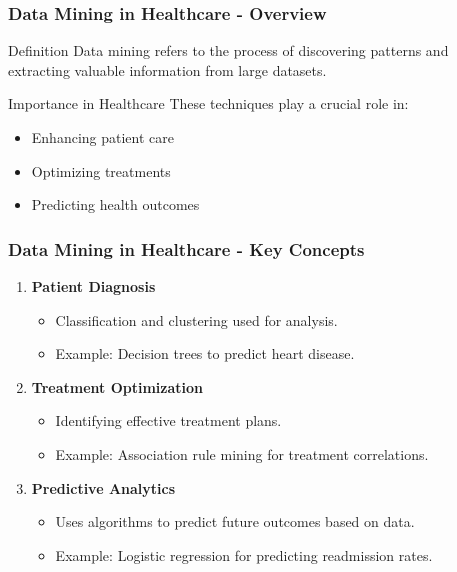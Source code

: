 \documentclass{beamer}
\begin{document}
\begin{frame}[fragile]
    \frametitle{Data Mining in Healthcare - Overview}
    \begin{block}{Definition}
        Data mining refers to the process of discovering patterns and extracting valuable information from large datasets.
    \end{block}
    \begin{block}{Importance in Healthcare}
        These techniques play a crucial role in:
        \begin{itemize}
            \item Enhancing patient care
            \item Optimizing treatments
            \item Predicting health outcomes
        \end{itemize}
    \end{block}
\end{frame}

\begin{frame}[fragile]
    \frametitle{Data Mining in Healthcare - Key Concepts}
    \begin{enumerate}
        \item \textbf{Patient Diagnosis}
        \begin{itemize}
            \item Classification and clustering used for analysis.
            \item Example: Decision trees to predict heart disease.
        \end{itemize}
        
        \item \textbf{Treatment Optimization}
        \begin{itemize}
            \item Identifying effective treatment plans.
            \item Example: Association rule mining for treatment correlations.
        \end{itemize}
        
        \item \textbf{Predictive Analytics}
        \begin{itemize}
            \item Uses algorithms to predict future outcomes based on data.
            \item Example: Logistic regression for predicting readmission rates.
        \end{itemize}
    \end{enumerate}
\end{frame}
\end{document}
